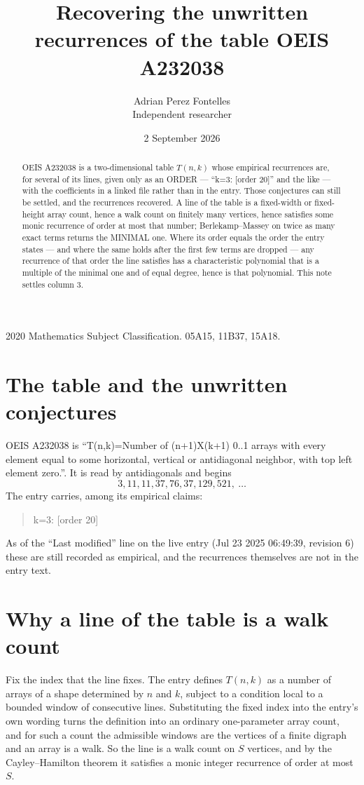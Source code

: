 \documentclass[11pt,a4paper]{article}
\title{Recovering the unwritten recurrences of the table OEIS A232038}
\author{Adrian Perez Fontelles\\ \small Independent researcher}
\date{2 September 2026}
\theoremstyle{plain}
\theoremstyle{definition}
\begin{document}
\maketitle

\begin{abstract}
OEIS A232038 is a two-dimensional table $T(n,k)$ whose empirical recurrences are, for several of
its lines, given only as an ORDER --- ``k=3: [order 20]'' and the like --- with the
coefficients in a linked file rather than in the entry. Those conjectures can still be settled,
and the recurrences recovered. A line of the table is a fixed-width or fixed-height array
count, hence a walk count on finitely many vertices, hence satisfies some monic recurrence of
order at most that number; Berlekamp--Massey on twice as many exact terms returns the MINIMAL
one. Where its order equals the order the entry states --- and where the same holds after the
first few terms are dropped --- any recurrence of that order the line satisfies has a
characteristic polynomial that is a multiple of the minimal one and of equal degree, hence is
that polynomial. This note settles column 3.
\end{abstract}

\noindent\small 2020 Mathematics Subject Classification. 05A15, 11B37, 15A18.\normalsize

\section{The table and the unwritten conjectures}

OEIS A232038 is ``T(n,k)=Number of (n+1)X(k+1) 0..1 arrays with every element equal to some horizontal, vertical or antidiagonal neighbor, with top left element zero.''. It is read by antidiagonals and begins
\[
3, 11, 11, 37, 76, 37, 129, 521,\ \dots
\]
The entry carries, among its empirical claims:
\begin{quote}\small
k=3: [order 20]
\end{quote}
As of the ``Last modified'' line on the live entry (Jul 23 2025 06:49:39, revision 6) these are still
recorded as empirical, and the recurrences themselves are not in the entry text.

\section{Why a line of the table is a walk count}

Fix the index that the line fixes. The entry defines $T(n,k)$ as a number of arrays of a shape
determined by $n$ and $k$, subject to a condition local to a bounded window of consecutive
lines. Substituting the fixed index into the entry's own wording turns the definition into an
ordinary one-parameter array count, and for such a count the admissible windows are the
vertices of a finite digraph and an array is a walk. So the line is a walk count on $S$
vertices, and by the Cayley--Hamilton theorem it satisfies a monic integer recurrence of order
at most $S$.
\end{document}

